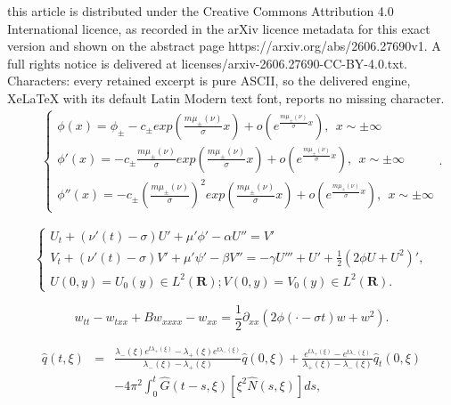 \documentclass[10pt,a4paper]{amsart}
\newcommand{\al}{\alpha}
\newcommand{\be}{\beta}
\newcommand{\f}[2]{\frac{#1}{#2}}
\newcommand{\ga}{\gamma}
\newcommand{\la}{\lambda}
\newcommand{\p}{\partial}
\newcommand{\rone}{\mathbf R}
\newcommand{\si}{\sigma}
\begin{document}
this article is distributed under the Creative Commons Attribution 4.0 International licence, as recorded in the arXiv licence metadata for this exact version and shown on the abstract page https://arxiv.org/abs/2606.27690v1. A full rights notice is delivered at licenses/arxiv-2606.27690-CC-BY-4.0.txt. Characters: every retained excerpt is pure ASCII, so the delivered engine, XeLaTeX with its default Latin Modern text font, reports no missing character.
\begin{eqnarray}
	\label{f:1} 
	& & \begin{cases}
		\phi(x)=\phi_\pm - c_\pm exp(\f{m \mu_{\pm}(\nu)}{\si} x)+o(e^{\f{m \mu_{\pm}(\nu)}{\si} x}), \ \ x\sim \pm \infty \\
		\phi'(x)=- c_\pm \f{m \mu_{\pm}(\nu)}{\si} exp(\f{m \mu_{\pm}(\nu)}{\si} x)+o(e^{\f{m \mu_{\pm}(\nu)}{\si} x}), \ \ x\sim \pm \infty \\
		\phi''(x)=- c_\pm \left(\f{m \mu_{\pm}(\nu)}{\si}\right)^2 exp(\f{m \mu_{\pm}(\nu)}{\si} x)+o(e^{\f{m \mu_{\pm}(\nu)}{\si} x}), \ \ x\sim \pm \infty 
		\end{cases}. 
\end{eqnarray}

\begin{equation}
	\label{105} 
	\begin{cases}
		U_t +(\nu'(t)-\si)  U'+\mu' \phi' - \al U''= V' \\
		V_t+(\nu'(t)-\si) V' +\mu'\psi'-\be  V''  = -\ga  U''' + U' + \f{1}{2} (2\phi U+U^2)', \\
		U(0,y)=U_0(y) \in L^2(\rone) ; V(0,y)= V_0(y) \in L^2(\rone). 
	\end{cases}
	\end{equation} 

\begin{equation}
	\label{400} 
	w_{tt} - w_{txx}+ B w_{xxxx} - w_{xx}= \f{1}{2} \p_{xx} (2\phi(\cdot-\si t)w+w^2).
\end{equation}

\begin{eqnarray}
	\label{420} 
		\hat{q}(t, \xi) &=& \f{\la_-(\xi) e^{t \la_+(\xi)}-\la_+(\xi) e^{t \la_-(\xi)}}{\la_-(\xi)-\la_+(\xi)} \hat{q}(0,\xi) + \f{e^{t \la_+(\xi)}-e^{t \la_-(\xi)}}{\la_+(\xi)-\la_-(\xi)} \hat{q}_t(0,\xi) \\
		\nonumber
		& & -4\pi^2 \int_0^t \hat{G}(t-s, \xi) [\xi^2 \hat{N}(s, \xi)] ds,
\end{eqnarray}
\end{document}

